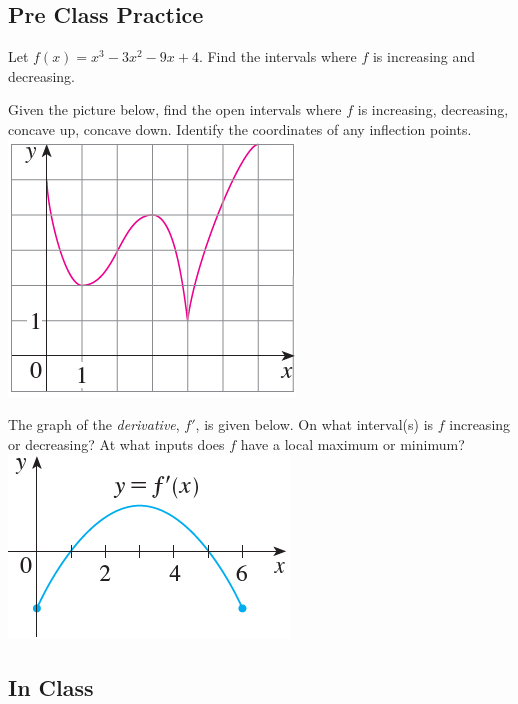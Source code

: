 \documentclass[notes]{subfiles}
\begin{document}
	\subsection*{Pre Class Practice}
		\begin{ex}
			Let \(f(x) = x^3-3x^2-9x+4\).  Find the intervals where \(f\) is increasing and decreasing.
		\end{ex}

		\begin{ex}
			Given the picture below, find the open intervals where \(f\) is increasing, decreasing, concave up, concave down.  Identify the coordinates of any inflection points.\\
			\includegraphics{4.5fig1}
		\end{ex}
			
		\begin{ex}
			The graph of the \emph{derivative}, \(f'\), is given below.  On what interval(s) is \(f\) increasing or decreasing? At what inputs does \(f\) have a local maximum or minimum?\\
			\includegraphics{4.5fig2}
		\end{ex}
		
			\newpage
			
	\subsection*{In Class}
\end{document}
